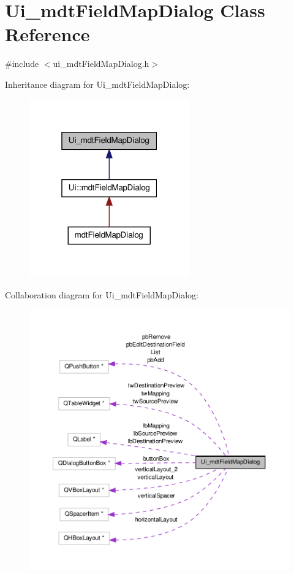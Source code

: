 \hypertarget{class_ui__mdt_field_map_dialog}{\section{Ui\-\_\-mdt\-Field\-Map\-Dialog Class Reference}
\label{class_ui__mdt_field_map_dialog}
}


{\ttfamily \#include $<$ui\-\_\-mdt\-Field\-Map\-Dialog.\-h$>$}



Inheritance diagram for Ui\-\_\-mdt\-Field\-Map\-Dialog\-:\nopagebreak
\begin{figure}[H]
\begin{center}
\leavevmode
\includegraphics[width=196pt]{class_ui__mdt_field_map_dialog__inherit__graph}
\end{center}
\end{figure}


Collaboration diagram for Ui\-\_\-mdt\-Field\-Map\-Dialog\-:\nopagebreak
\begin{figure}[H]
\begin{center}
\leavevmode
\includegraphics[width=350pt]{class_ui__mdt_field_map_dialog__coll__graph}
\end{center}
\end{figure}
